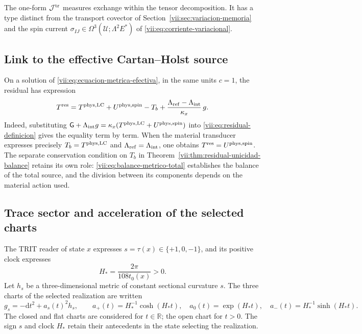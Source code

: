 The one-form \(\mathcal J^{\rm tr}\) measures exchange within the tensor
decomposition. It has a type distinct from the transport covector of
Section~\ref{vii:sec:variacion-memoria} and the spin current
\(\sigma_{IJ}\in\Omega^3(\mathcal U;\Lambda^2E^*)\) of
\eqref{vii:eq:corriente-variacional}.

\subsection{Link to the effective Cartan--Holst source}
\label{vii:subsec:residual-fuente-cartan}

On a solution of \eqref{vii:eq:ecuacion-metrica-efectiva}, in the
same units \(c=1\), the residual has expression
\begin{equation}
 T^{\rm res}
 =T^{\rm phys,LC}+U^{\rm phys,spin}-T_b
   +\frac{\Lambda_{\rm ref}-\Lambda_{\rm int}}{\kappa_x}\,g.
 \label{vii:eq:residual-composicion-cartan}
\end{equation}
Indeed, substituting
\(\mathsf G+\Lambda_{\rm int}g
  =\kappa_x(T^{\rm phys,LC}+U^{\rm phys,spin})\)
into \eqref{vii:eq:residual-definicion} gives the equality term by term.
When the material transducer expresses precisely
\(T_b=T^{\rm phys,LC}\) and \(\Lambda_{\rm ref}=\Lambda_{\rm int}\),
one obtains \(T^{\rm res}=U^{\rm phys,spin}\).
The separate conservation condition on \(T_b\) in
Theorem~\ref{vii:thm:residual-unicidad-balance} retains its own
role: \eqref{vii:eq:balance-metrico-total} establishes the balance of the
total source, and the division between its components depends on the
material action used.

\subsection{Trace sector and acceleration of the selected charts}
\label{vii:subsec:residual-aceleracion-ds}

The TRIT reader of state \(x\) expresses \(s=\tau(x)\in\{+1,0,-1\}\),
and its positive clock expresses
\begin{equation}
 H_*=\frac{2\pi}{108t_0(x)}>0.
 \label{vii:eq:reloj-carta-ds}
\end{equation}
Let \(h_s\) be a three-dimensional metric of constant sectional curvature
\(s\). The three charts of the selected realization are written
\begin{equation}
 g_s=-\mathrm dt^2+a_s(t)^2h_s,\qquad
 a_+(t)=H_*^{-1}\cosh(H_*t),\quad
 a_0(t)=\exp(H_*t),\quad
 a_-(t)=H_*^{-1}\sinh(H_*t).
 \label{vii:eq:cartas-ds-residual}
\end{equation}
The closed and flat charts are considered for \(t\in\mathbb R\);
the open chart for \(t>0\). The sign \(s\) and clock \(H_*\)
retain their antecedents in the state selecting the realization.

